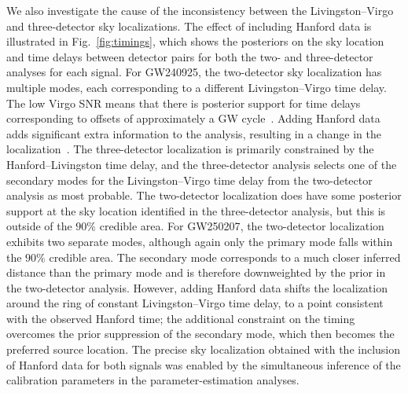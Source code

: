 We also investigate the cause of the inconsistency between the Livingston--Virgo and three-detector sky localizations.
The effect of including Hanford data is illustrated in Fig.~\ref{fig:timings}, which shows the posteriors on the sky location and time delays between detector pairs for both the two- and three-detector analyses for each signal.
For \ac{GW240925}, the two-detector sky localization has multiple modes, each corresponding to a different Livingston--Virgo time delay.
The low Virgo \ac{SNR} means that there is posterior support for time delays corresponding to offsets of approximately a \ac{GW} cycle~\cite{Essick:2014wwa}.
Adding Hanford data adds significant extra information to the analysis, resulting in a change in the localization~\cite{Singer:2014qca,Ouzriat:2025ben}.
The three-detector localization is primarily constrained by the Hanford--Livingston time delay, and the three-detector analysis selects one of the secondary modes for the Livingston--Virgo time delay from the two-detector analysis as most probable.
The two-detector localization does have some posterior support at the sky location identified in the three-detector analysis, but this is outside of the $90\%$ credible area.
For \ac{GW250207}, the two-detector localization exhibits two separate modes, although again only the primary mode falls within the $90\%$ credible area.
The secondary mode corresponds to a much closer inferred distance than the primary mode and is therefore downweighted by the prior in the two-detector analysis.
However, adding Hanford data shifts the localization around the ring of constant Livingston--Virgo time delay, to a point consistent with the observed Hanford time; the additional constraint on the timing overcomes the prior suppression of the secondary mode, which then becomes the preferred source location.
The precise sky localization obtained with the inclusion of Hanford data for both signals was enabled by the simultaneous inference of the calibration parameters in the parameter-estimation analyses.


